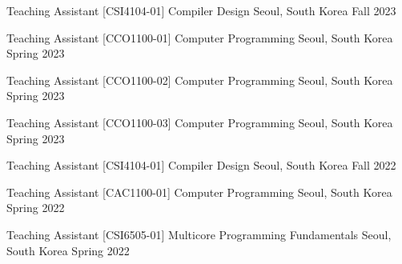 

\begin{cventries}

  \cventry
    {Teaching Assistant} %
    {[CSI4104-01] Compiler Design} %
    {Seoul, South Korea} %
    {Fall 2023} %
    {}

  \cventry
    {Teaching Assistant} %
    {[CCO1100-01] Computer Programming} %
    {Seoul, South Korea} %
    {Spring 2023} %
    {}

  \cventry
    {Teaching Assistant} %
    {[CCO1100-02] Computer Programming} %
    {Seoul, South Korea} %
    {Spring 2023} %
    {}

  \cventry
    {Teaching Assistant} %
    {[CCO1100-03] Computer Programming} %
    {Seoul, South Korea} %
    {Spring 2023} %
    {}

  \cventry
    {Teaching Assistant} %
    {[CSI4104-01] Compiler Design} %
    {Seoul, South Korea} %
    {Fall 2022} %
    {}

  \cventry
    {Teaching Assistant} %
    {[CAC1100-01] Computer Programming} %
    {Seoul, South Korea} %
    {Spring 2022} %
    {}

  \cventry
    {Teaching Assistant} %
    {[CSI6505-01] Multicore Programming Fundamentals} %
    {Seoul, South Korea} %
    {Spring 2022} %
    {}
\end{cventries}
